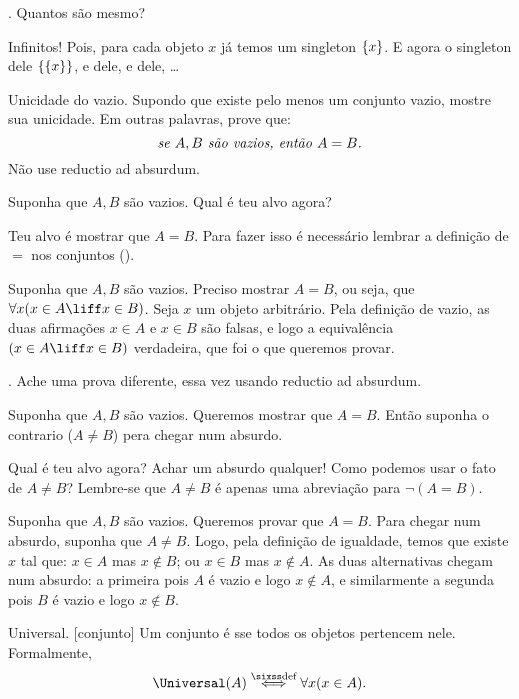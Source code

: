 \exercise.
\label{how_many_singletons}%
Quantos são mesmo?

\solution
Infinitos!  Pois, para cada objeto $x$ já temos um singleton $\set{x}$.
E agora o singleton dele $\set{\set{x}}$, e dele, e dele, \dots

\endexercise

\exercise Unicidade do vazio.
\label{naive_uniqueness_of_emptyset}%
Supondo que existe pelo menos um conjunto vazio, mostre sua unicidade.
Em outras palavras, prove que:
$$
\text{\emph{se $A,B$ são vazios, então $A = B$.}}
$$
Não use reductio ad absurdum.

\hint
Suponha que $A,B$ são vazios.
Qual é teu alvo agora?

\hint
Teu alvo é mostrar que $A = B$.
Para fazer isso é necessário lembrar a definição de $=$ nos conjuntos ().

\solution
Suponha que $A,B$ são vazios.
Preciso mostrar $A=B$, ou seja, que $\forall x( x\in A \liff x \in B )$.
Seja $x$ um objeto arbitrário.
Pela definição de vazio, as duas afirmações $x \in A$ e $x \in B$ são
falsas, e logo a equivalência $(x\in A \liff x\in B)$ verdadeira,
que foi o que queremos provar.

\endexercise

\exercise.
\label{naive_uniqueness_of_emptyset_absurdum}%
Ache uma prova diferente, essa vez usando reductio ad absurdum.

\hint
Suponha que $A,B$ são vazios.
Queremos mostrar que $A = B$.
Então suponha o contrario ($A \neq B$) pera chegar num absurdo.

\hint
Qual é teu alvo agora?
Achar um absurdo qualquer!
Como podemos usar o fato de $A \neq B$?
Lembre-se que $A \neq B$ é apenas uma abreviação para $\lnot(A = B)$.

\solution
Suponha que $A,B$ são vazios.
Queremos provar que $A = B$.
Para chegar num absurdo, suponha que $A \neq B$.
Logo, pela definição de igualdade, temos
que existe $x$ tal que:
$x \in A$ mas $x \notin B$; ou $x \in B$ mas $x \notin A$.
As duas alternativas chegam num absurdo:
a primeira pois $A$ é vazio e logo $x \notin A$, e similarmente
a segunda pois $B$ é vazio e logo $x \notin B$.

\endexercise

 Universal.
[conjunto]%
%
\label{universal}%
Um conjunto é  sse todos os objetos pertencem nele.
Formalmente,
$$
\Universal(A) \defiff \forall x(x \in A).
$$

